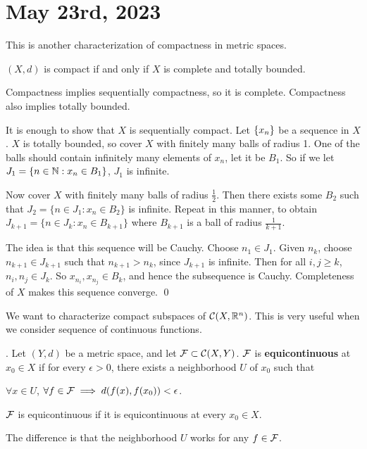 \section*{May 23rd, 2023}

This is another characterization of compactness in metric spaces.

 \((X, d)\) is compact if and only if \(X\) is complete and totally bounded.

\pf \note{\mimp} Compactness implies sequentially compactness, so it is complete. Compactness also implies totally bounded.

\note{\mimpd} It is enough to show that \(X\) is sequentially compact. Let \(\left\{ x_n \right\}\) be a sequence in \(X\). \(X\) is totally bounded, so cover \(X\) with finitely many balls of radius 1. One of the balls should contain infinitely many elements of \(x_n\), let it be \(B_1\). So if we let \(J_1 = \{n \in \mathbb{N} : x_n \in B_1\}\), \(J_1\) is infinite.

Now cover \(X\) with finitely many balls of radius \(\frac{1}{2}\). Then there exists some \(B_2\) such that \(J_2 = \{n \in J_1 : x_n \in B_2\}\) is infinite. Repeat in this manner, to obtain \(J_{k+1} = \{n \in J_{k} : x_n \in B_{k+1}\}\) where \(B_{k+1}\) is a ball of radius \(\frac{1}{k+1}\).

The idea is that this sequence will be Cauchy. Choose \(n_1 \in J_1\). Given \(n_k\), choose \(n_{k+1} \in J_{k+1}\) such that \(n_{k+1} > n_k\), since \(J_{k+1}\) is infinite. Then for all \(i, j \geq k\), \(n_i, n_j \in J_k\). So \(x_{n_i}, x_{n_j} \in B_k\), and hence the subsequence is Cauchy. Completeness of \(X\) makes this sequence converge. \qed

We want to characterize compact subspaces of \(\mathcal{C}(X, \mathbb{R}^n)\). This is very useful when we consider sequence of continuous functions.

.  Let \((Y, d)\) be a metric space, and let \(\mathcal{F} \subset \mathcal{C}(X, Y)\). \(\mathcal{F}\) is \textbf{equicontinuous} at \(x_0 \in X\) if for every \(\epsilon > 0\), there exists a neighborhood \(U\) of \(x_0\) such that
\begin{center}
    \(\forall x \in U\), \(\forall f \in \mathcal{F} \implies d(f(x), f(x_0)) < \epsilon\).
\end{center}
\(\mathcal{F}\) is equicontinuous if it is equicontinuous at every \(x_0 \in X\).

The difference is that the neighborhood \(U\) works for any \(f \in \mathcal{F}\).

